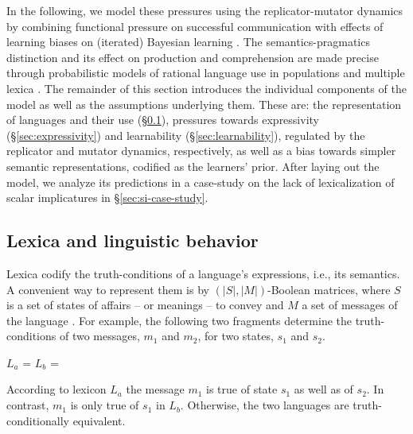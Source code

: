 \documentclass[a4paper]{article}
\begin{document}
In the following, we model these pressures using the replicator-mutator dynamics by combining functional pressure on successful communication with effects of learning biases on (iterated) Bayesian learning \citep{griffiths+kalish:2007}. The semantics-pragmatics distinction and its effect on production and comprehension are made precise through probabilistic models of rational language use in populations and multiple lexica \citep{frank+goodman:2012,franke+jaeger:2014, bergen+etal:2016}. The remainder of this section introduces the individual components of the model as well as the assumptions underlying them. These are: the representation of languages and their use (\S\ref{sec:languages+use}), pressures towards expressivity (\S\ref{sec:expressivity}) and learnability (\S\ref{sec:learnability}), regulated by the replicator and mutator dynamics, respectively, as well as a bias towards simpler semantic representations, codified as the learners' prior. After laying out the model, we analyze its predictions in a case-study on the lack of lexicalization of scalar implicatures in \S\ref{sec:si-case-study}.  



\subsection{Lexica and linguistic behavior}\label{sec:languages+use}
Lexica codify the truth-conditions of a language's expressions, i.e., its semantics. A convenient way to represent them is by $(|S|,|M|)$-Boolean matrices, where $S$ is a set of states of affairs -- or meanings -- to convey and $M$ a set of messages of the language \citep{franke+jaeger:2014}. For example, the following two fragments determine the truth-conditions of two messages, $m_1$ and $m_2$, for two states, $s_1$ and $s_2$.

\begin{centering}
$L_a$ =  \hspace{2cm} $L_b$ = \\[0.5cm]
\end{centering}


According to lexicon $L_a$ the message $m_1$ is true of state $s_1$ as well as of $s_2$. In contrast, $m_1$ is only true of $s_1$ in $L_b$. Otherwise, the two languages are truth-conditionally equivalent. 
\end{document}
